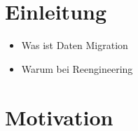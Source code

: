 \documentclass[11pt]{scrartcl}
\newif\iffull
\begin{document}
	
\iffull
\title{Data Migration} 

\subtitle{Untertitel}


\date{Modul Software Reengineering 2015/2016\\
  \small Fachbereich Informatik\\ 
  Arbeitsbereich Softwarekonstruktion \& Werkzeuge\\ 
  Universit"at Hamburg\\[4mm]
  \today}

\maketitle

\begin{abstract}
	\small\noindent\textbf{Abstract}

	\noindent Abstract 
\end{abstract}

\newpage
\tableofcontents
\newpage

\fi



\nocite{morris-2012}
\nocite{henrard-2002}
\nocite{behm-1997}
\nocite{datamigrations}
\nocite{ackermann-2005}
\nocite{wagner-2011}
\nocite{wu-1997}
\nocite{rahm-2010}
\nocite{alhajj-2001}

\section{Einleitung}

\begin{itemize}
	\item Was ist Daten Migration
	\item Warum bei Reengineering
\end{itemize}

\section{Motivation}
\end{document}
